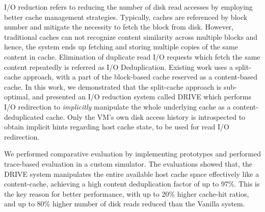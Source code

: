 
I/O reduction refers to reducing the number of disk read accesses by
employing better cache management strategies. Typically, caches are 
referenced by block number and mitigate the necessity to fetch the block
from disk. However, traditional caches can not recognize content similarity
across multiple blocks and hence, the system ends up fetching and storing 
multiple copies of the same content in cache.
Elimination of duplicate read I/O requests which fetch the same 
content repeatedly is referred as I/O Deduplication.
Existing work uses a split-cache approach, with a part of the block-based
cache reserved as a content-based cache. In this work, we demonstrated
that the split-cache approach is sub-optimal, and presented an
I/O reduction system called DRIVE which performs I/O 
redirection to \textit{implicitly} manipulate the whole underlying cache as 
a content-deduplicated cache. Only the VM's own disk access history is
introspected to obtain implicit hints regarding host cache state, to be used
for read I/O redirection.

We performed comparative evaluation by implementing 
prototypes and performed trace-based evaluation in a custom simulator. 
The evaluations showed that, 
the DRIVE system
manipulates the entire available host cache space effectively like
a content-cache, achieving a high content deduplication factor of up to 97\%.
This is the key reason for better performance, with
up to 20\% higher cache-hit ratios,
and up to 80\% higher number of disk reads reduced than the Vanilla system.
